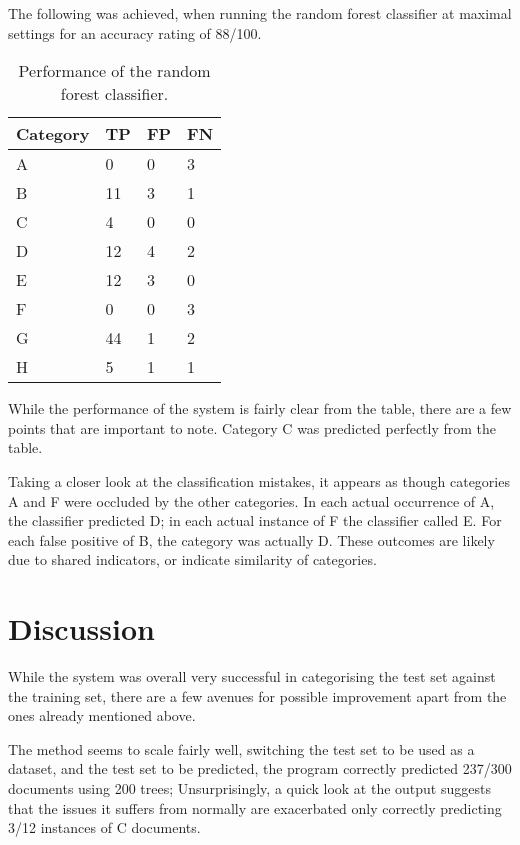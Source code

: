 \documentclass[11pt]{article}
\begin{document}
The following was achieved, when running the random forest classifier at maximal
settings for an accuracy rating of 88/100.

\begin{table}[h]
\begin{center}
    \begin{tabular}{|l|l|l|l|}
        \hline
        Category & TP & FP & FN \\
        \hline \hline
        A & 0   & 0 & 3 \\
        B & 11  & 3 & 1 \\
        C & 4   & 0 & 0 \\
        D & 12  & 4 & 2 \\
        E & 12  & 3 & 0 \\
        F & 0   & 0 & 3 \\
        G & 44  & 1 & 2 \\
        H & 5   & 1 & 1 \\
        \hline
    \end{tabular}
\caption{Performance of the random forest classifier.}\label{table1}
\end{center}
\end{table}

While the performance of the system is fairly clear from the table, there are a
few points that are important to note. Category C was predicted perfectly from
the table.

Taking a closer look at the classification mistakes, it appears as though
categories A and F were occluded by the other categories. In each actual
occurrence of A, the classifier predicted D; in each actual instance of F the
classifier called E. For each false positive of B, the category was actually D.
These outcomes are likely due to shared indicators, or indicate similarity of
categories.

\section{Discussion}

While the system was overall very successful in categorising the test set
against the training set, there are a few avenues for possible improvement
apart from the ones already mentioned above.

The method seems to scale fairly well, switching the test set to be used as a
dataset, and the test set to be predicted, the program correctly predicted
237/300 documents using 200 trees; Unsurprisingly, a quick look at the output
suggests that the issues it suffers from normally are exacerbated only
correctly predicting 3/12 instances of C documents.
\end{document}
